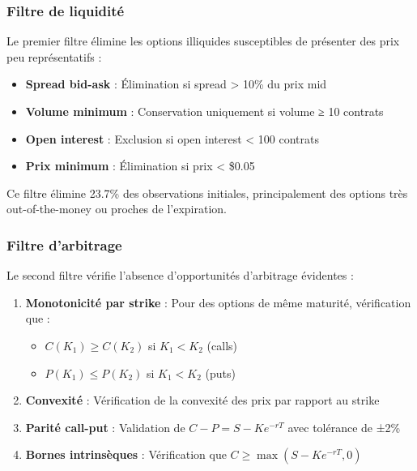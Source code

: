 \subsubsection{Filtre de liquidité}

Le premier filtre élimine les options illiquides susceptibles de présenter des prix peu représentatifs :

\begin{itemize}
\item \textbf{Spread bid-ask} : Élimination si spread > 10\% du prix mid
\item \textbf{Volume minimum} : Conservation uniquement si volume ≥ 10 contrats
\item \textbf{Open interest} : Exclusion si open interest < 100 contrats
\item \textbf{Prix minimum} : Élimination si prix < \$0.05
\end{itemize}

Ce filtre élimine 23.7\% des observations initiales, principalement des options très out-of-the-money ou proches de l'expiration.

\subsubsection{Filtre d'arbitrage}

Le second filtre vérifie l'absence d'opportunités d'arbitrage évidentes :

\begin{enumerate}
\item \textbf{Monotonicité par strike} : Pour des options de même maturité, vérification que :
   \begin{itemize}
   \item $C(K_1) \geq C(K_2)$ si $K_1 < K_2$ (calls)
   \item $P(K_1) \leq P(K_2)$ si $K_1 < K_2$ (puts)
   \end{itemize}

\item \textbf{Convexité} : Vérification de la convexité des prix par rapport au strike

\item \textbf{Parité call-put} : Validation de $C - P = S - Ke^{-rT}$ avec tolérance de ±2\%

\item \textbf{Bornes intrinsèques} : Vérification que $C \geq \max(S - Ke^{-rT}, 0)$
\end{enumerate}

